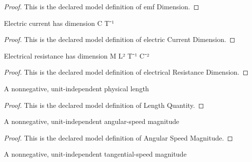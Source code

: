 \begin{proof}
  This is the declared model definition of emf Dimension.
\end{proof}
\begin{definition}
  \label{def:physics:phyx-mini-0920:phyxminiproblems-problemphyxmini0920-electriccurrentdimension}
  Electric current has dimension C T⁻¹
\end{definition}
\begin{proof}
  This is the declared model definition of electric Current Dimension.
\end{proof}
\begin{definition}
  \label{def:physics:phyx-mini-0920:phyxminiproblems-problemphyxmini0920-electricalresistancedimension}
  Electrical resistance has dimension M L² T⁻¹ C⁻²
\end{definition}
\begin{proof}
  This is the declared model definition of electrical Resistance Dimension.
\end{proof}
\begin{definition}
  \label{def:physics:phyx-mini-0920:phyxminiproblems-problemphyxmini0920-lengthquantity}
  A nonnegative, unit-independent physical length
\end{definition}
\begin{proof}
  This is the declared model definition of Length Quantity.
\end{proof}
\begin{definition}
  \label{def:physics:phyx-mini-0920:phyxminiproblems-problemphyxmini0920-angularspeedmagnitude}
  A nonnegative, unit-independent angular-speed magnitude
\end{definition}
\begin{proof}
  This is the declared model definition of Angular Speed Magnitude.
\end{proof}
\begin{definition}
  \label{def:physics:phyx-mini-0920:phyxminiproblems-problemphyxmini0920-speedmagnitude}
  A nonnegative, unit-independent tangential-speed magnitude
\end{definition}
